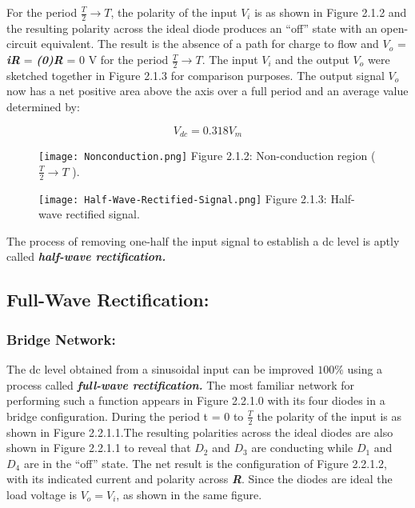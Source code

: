 For the period $\frac{T}{2} \rightarrow T$, the polarity of the input $V_{i}$ is as shown in Figure 2.1.2 and
the resulting polarity across the ideal diode produces an “off” state with an open-circuit
equivalent. The result is the absence of a path for charge to flow and $V_{o}$ = {\bfseries\itshape iR} =
{\bfseries\itshape (0)R} = 0 V for the period $\frac{T}{2} \rightarrow T$. The input $V_{i}$ and the output $V_{o}$ were sketched together in Figure 2.1.3 for comparison purposes. The output signal $V_{o}$ now has a net positive
area above the axis over a full period and an average value determined by:

\begin{equation}
V_{dc} = 0.318 V_{m}
\end{equation}

\begin{figure}[H]
\texttt{[image: Nonconduction.png]}
\centering \linebreak \linebreak Figure 2.1.2: Non-conduction region  ( $\frac{T}{2} \rightarrow T$ ).
\end{figure}

\begin{multicols}{2}
\begin{figure}[H]
\texttt{[image: Half-Wave-Rectified-Signal.png]}
\centering \linebreak \linebreak Figure 2.1.3: Half-wave rectified signal.
\end{figure}

The process of removing one-half the input signal to establish a dc level is aptly
called {\bfseries\itshape half-wave rectification.}
\end{multicols}

\subsection{Full-Wave Rectification:}

\subsubsection{Bridge Network:}

The dc level obtained from a sinusoidal input can be improved $100 \%$ using a process
called {\bfseries\itshape full-wave rectification.} The most familiar network for performing such a function 
appears in Figure 2.2.1.0 with its four diodes in a bridge configuration. During the
period t = 0 to $\frac{T}{2}$ the polarity of the input is as shown in Figure 2.2.1.1.The resulting polarities across the ideal diodes are also shown in Figure 2.2.1.1 to reveal that $D_{2}$ and $D_{3}$
are conducting while $D_{1}$ and $D_{4}$ are in the “off” state. The net result is the configuration
of Figure 2.2.1.2, with its indicated current and polarity across {\bfseries\itshape R}. Since the diodes
are ideal the load voltage is $V_{o} = V_{i}$, as shown in the same figure.

